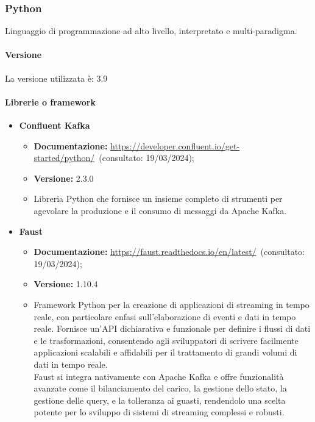 \subsubsection{Python}
Linguaggio di programmazione ad alto livello, interpretato e multi-paradigma.
\paragraph{Versione}
La versione utilizzata è: 3.9

\paragraph{Librerie o framework}

\begin{itemize}
    \item \textbf{Confluent Kafka}
    \begin{itemize}
        \item \textbf{Documentazione:} \url{https://developer.confluent.io/get-started/python/}~(consultato: 19/03/2024);
        \item \textbf{Versione:} 2.3.0
        \item Libreria Python che fornisce un insieme completo di strumenti per agevolare la produzione e il consumo di messaggi da Apache Kafka. 
    \end{itemize}
    
    \item \textbf{Faust}
    \begin{itemize}
        \item \textbf{Documentazione:} \url{https://faust.readthedocs.io/en/latest/}~(consultato: 19/03/2024);
        \item \textbf{Versione:} 1.10.4
        \item Framework Python per la creazione di applicazioni di streaming in tempo reale, con particolare enfasi sull'elaborazione di eventi e dati in tempo reale. Fornisce un'API dichiarativa e funzionale per definire i flussi di dati e le trasformazioni, consentendo agli sviluppatori di scrivere facilmente applicazioni scalabili e affidabili per il trattamento di grandi volumi di dati in tempo reale. \\
        Faust si integra nativamente con Apache Kafka e offre funzionalità avanzate come il bilanciamento del carico, la gestione dello stato, la gestione delle query, e la tolleranza ai guasti, rendendolo una scelta potente per lo sviluppo di sistemi di  streaming complessi e robusti.
    \end{itemize}
    

\end{itemize}
